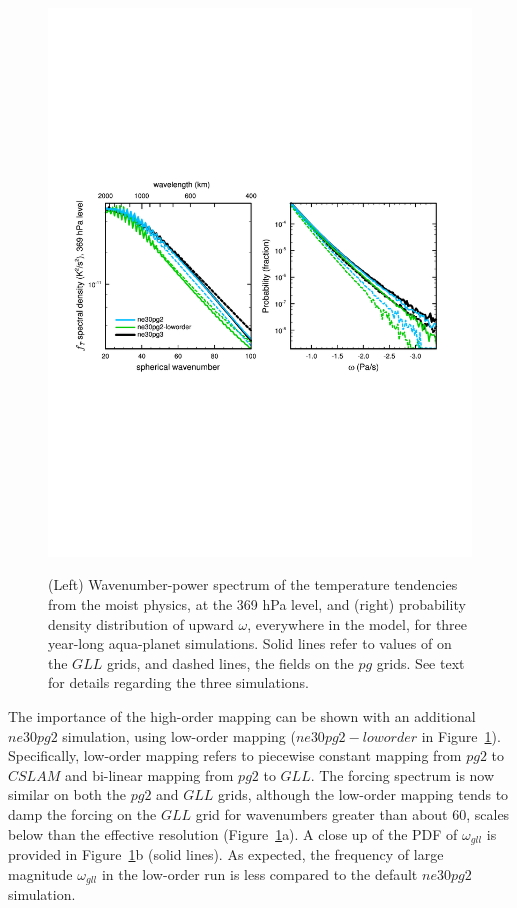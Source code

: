 \documentclass{agujournal}
\begin{document}
\begin{figure}[t]
\begin{center}
\noindent\includegraphics[width=30pc,angle=0]{figs/panel_loworder.pdf}\\
\end{center}
\caption{(Left) Wavenumber-power spectrum of the temperature tendencies from the moist physics, at the 369 hPa level, and (right) probability density distribution of upward $\omega$, everywhere in the model, for three year-long aqua-planet simulations. Solid lines refer to values of on the $GLL$ grids, and dashed lines, the fields on the $pg$ grids. See text for details regarding the three simulations.}
\label{fig:loworder}
\end{figure}

The importance of the high-order mapping can be shown with an additional $ne30pg2$ simulation, using low-order mapping ($ne30pg2-loworder$ in Figure~\ref{fig:loworder}). Specifically, low-order mapping refers to piecewise constant mapping from $pg2$ to $CSLAM$ and bi-linear mapping from $pg2$ to $GLL$. The forcing spectrum is now similar on both the $pg2$ and $GLL$ grids, although the low-order mapping tends to damp the forcing on the $GLL$ grid for wavenumbers greater than about 60, scales below than the effective resolution (Figure~\ref{fig:loworder}a). A close up of the PDF of $\omega_{gll}$ is provided in Figure~\ref{fig:loworder}b (solid lines). As expected, the frequency of large magnitude $\omega_{gll}$ in the low-order run is less compared to the default $ne30pg2$ simulation. 
\end{document}
